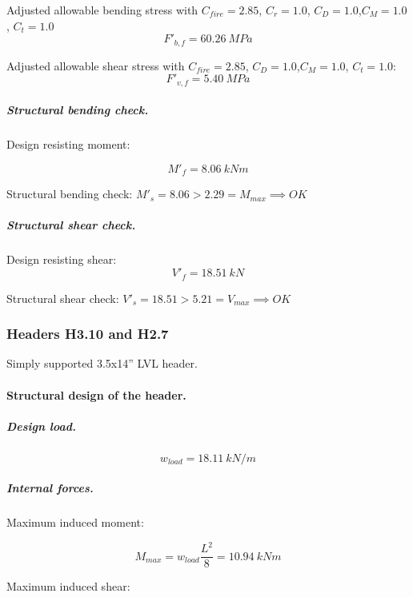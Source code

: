 \noindent Adjusted allowable bending stress with $C_{fire}= 2.85$, $C_r= 1.0$, $C_D= 1.0$,$C_M= 1.0$, $C_t= 1.0$
\begin{equation}
  F'_{b,f}= 60.26\ MPa
\end{equation}

\noindent Adjusted allowable shear stress with  $C_{fire}= 2.85$, $C_D= 1.0$,$C_M= 1.0$, $C_t= 1.0$:
\begin{equation}
  F'_{v,f}= 5.40\ MPa
\end{equation}

\subparagraph{Structural bending check.}

\noindent Design resisting moment:

\begin{equation}
  M'_f= 8.06\ kN m
\end{equation}

\noindent Structural bending check: $M'_s = 8.06 > 2.29 = M_{max} \implies OK$

\subparagraph{Structural shear check.}

\noindent Design resisting shear:
\begin{equation}
  V'_f= 18.51\ kN
\end{equation}

\noindent Structural shear check: $V'_s = 18.51 > 5.21 = V_{max} \implies OK$

\subsubsection{Headers H3.10 and H2.7}
Simply supported 3.5x14'' LVL header.

\paragraph{Structural design of the header.}

\subparagraph{Design load.}

\begin{equation}
  w_{load}= 18.11\ kN/m
\end{equation}

\subparagraph{Internal forces.}

\noindent Maximum induced moment:

\begin{equation}
  M_{max}= w_{load} \frac{L^2}{8}= 10.94\ kN m
\end{equation}

\noindent Maximum induced shear:

